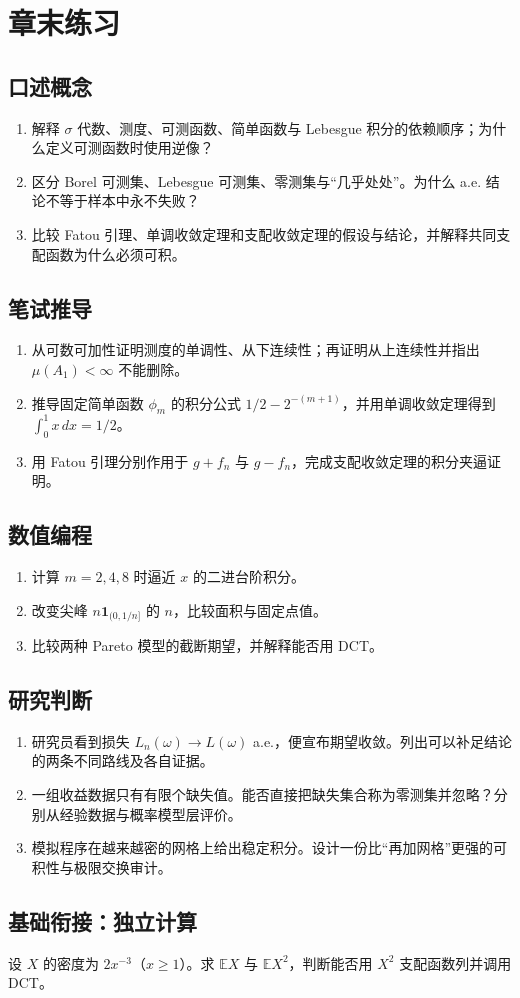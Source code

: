 \section*{章末练习}
\begingroup\small
\subsection*{口述概念}
\begin{enumerate}[nosep,leftmargin=*]
  \item 解释 $\sigma$ 代数、测度、可测函数、简单函数与 Lebesgue 积分的依赖顺序；为什么定义可测函数时使用逆像？
  \item 区分 Borel 可测集、Lebesgue 可测集、零测集与“几乎处处”。为什么 a.e. 结论不等于样本中永不失败？
  \item 比较 Fatou 引理、单调收敛定理和支配收敛定理的假设与结论，并解释共同支配函数为什么必须可积。
\end{enumerate}

\subsection*{笔试推导}
\begin{enumerate}[nosep,leftmargin=*]
  \item 从可数可加性证明测度的单调性、从下连续性；再证明从上连续性并指出 $\mu(A_1)<\infty$ 不能删除。
  \item 推导固定简单函数 $\phi_m$ 的积分公式 $1/2-2^{-(m+1)}$，并用单调收敛定理得到 $\int_0^1x\,dx=1/2$。
  \item 用 Fatou 引理分别作用于 $g+f_n$ 与 $g-f_n$，完成支配收敛定理的积分夹逼证明。
\end{enumerate}

\subsection*{数值编程}
\begin{enumerate}[leftmargin=*]
  \item 计算 $m=2,4,8$ 时逼近 $x$ 的二进台阶积分。
  \item 改变尖峰 $n\mathbf1_{(0,1/n]}$ 的 $n$，比较面积与固定点值。
  \item 比较两种 Pareto 模型的截断期望，并解释能否用 DCT。
\end{enumerate}

\subsection*{研究判断}
\begin{enumerate}[nosep,leftmargin=*]
  \item 研究员看到损失 $L_n(\omega)\to L(\omega)$ a.e.，便宣布期望收敛。列出可以补足结论的两条不同路线及各自证据。
  \item 一组收益数据只有有限个缺失值。能否直接把缺失集合称为零测集并忽略？分别从经验数据与概率模型层评价。
  \item 模拟程序在越来越密的网格上给出稳定积分。设计一份比“再加网格”更强的可积性与极限交换审计。
\end{enumerate}
\endgroup

\subsection*{基础衔接：独立计算}
设 $X$ 的密度为 $2x^{-3}$（$x\geq1$）。求 $\mathbb EX$ 与 $\mathbb EX^2$，判断能否用 $X^2$ 支配函数列并调用 DCT。

